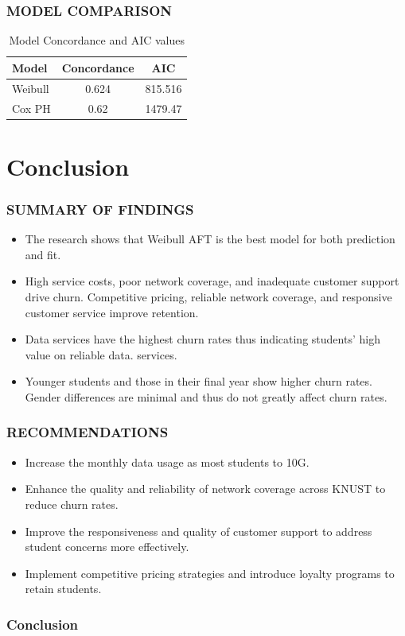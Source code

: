 \documentclass{beamer}
\begin{document}
	
	\begin{frame}
		\frametitle{MODEL COMPARISON}
		\begin{table}[H]
			\centering
			\begin{tabular}{lcc}
				\toprule
				\textbf{Model} & \textbf{Concordance} & \textbf{AIC} \\
				\midrule
				Weibull & 0.624 & 815.516 \\
				Cox PH & 0.62 & 1479.47 \\
				\bottomrule
			\end{tabular}
			\caption{Model Concordance and AIC values}
			\label{Table 2}
			
		\end{table}
		
	\end{frame}
	
	\section{Conclusion}
	
	\begin{frame}
		\frametitle{SUMMARY OF FINDINGS}
		\begin{itemize}
			\item The research shows that Weibull AFT is the best model for both prediction and fit.
			\item  High service costs, poor network coverage, and inadequate customer support drive churn. Competitive pricing, reliable network coverage, and responsive customer service improve retention.
			\item Data services have the highest churn rates thus indicating students' high value on reliable data. services.
			\item Younger students and those in their final year show higher churn rates. Gender differences are minimal and thus do not greatly affect churn rates.
		\end{itemize}
	\end{frame}
	
	\begin{frame}
		\frametitle{RECOMMENDATIONS}
		\begin{itemize}
			\item Increase the monthly data usage as most students to 10G.
			\item Enhance the quality and reliability of network coverage across KNUST to reduce churn rates.
			\item Improve the responsiveness and quality of customer support to address student concerns more effectively.
			\item Implement competitive pricing strategies and introduce loyalty programs to retain students.
			
		\end{itemize}
	\end{frame}
	
	\begin{frame}
		\frametitle{Conclusion}
		\centering{ THANK YOU}
		
		
		
	\end{frame}
	
\end{document}
